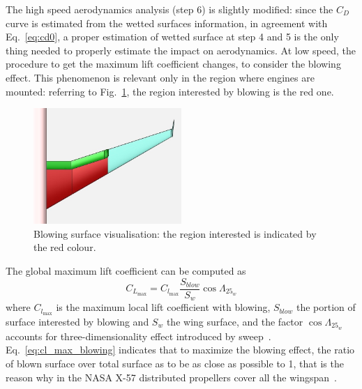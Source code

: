 The high speed aerodynamics analysis (step 6) is slightly modified: since the $C_D$ curve is estimated from the wetted surfaces information, in agreement with Eq.~\eqref{eq:cd0}, a proper estimation of wetted surface at step 4 and 5 is the only thing needed to properly estimate the impact on aerodynamics. 
At low speed, the procedure to get the maximum lift coefficient changes, to consider the blowing effect.
This phenomenon is relevant only in the region where engines are mounted: referring to Fig.~\ref{fig:wing_blowing_visualisation}, the region interested by blowing is the red one. 
\begin{figure}[!h]
	\centering
	\includegraphics[keepaspectratio, width=0.5\textwidth]{images/chap3/blowing_surface.jpg}
	\caption{Blowing surface visualisation: the region interested is indicated by the red colour.}
	\label{fig:wing_blowing_visualisation}
\end{figure} 
The global maximum lift coefficient can be computed as
\begin{equation}
\label{eq:cl_max_blowing}
C_{L_{\max}} = C_{l_{\max}} \frac{S_{blow}}{S_{w}}\cos\Lambda_{25_{w}}
\end{equation}
where $C_{l_{\max}}$ is the maximum local lift coefficient with blowing, $S_{blow}$ the portion of surface interested by blowing and $S_{w}$ the wing surface, and the factor $\cos\Lambda_{25_{w}}$ accounts for three-dimensionality effect introduced by sweep~\cite{bib:abbott}. 
Eq.~\eqref{eq:cl_max_blowing} indicates that to maximize the blowing effect, the ratio of blown surface over total surface as to be as close as possible to 1, that is the reason why in the NASA X-57 distributed propellers cover all the wingspan~\cite{bib:borer_sceptor}. 

